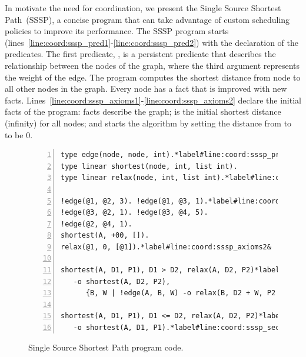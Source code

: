 In motivate the need for coordination, we present the Single Source Shortest
Path~(SSSP), a concise program that can take advantage of custom scheduling
policies to improve its performance. The SSSP program starts
(lines~\ref{line:coord:sssp_pred1}-\ref{line:coord:sssp_pred2}) with the
declaration of the predicates. The first predicate, , is a persistent
predicate that describes the relationship between the nodes of the graph, where
the third argument represents the weight of the edge.  The program computes the
shortest distance from node  to all other nodes in the graph. Every
node has a  fact that is improved with new  facts.
Lines~\ref{line:coord:sssp_axioms1}-\ref{line:coord:sssp_axioms2} declare the
initial facts of the program:  facts describe the graph;  is the initial shortest distance (infinity) for all nodes; and
 starts the algorithm by setting the distance from
 to  to be 0.

\begin{figure}[ht]
\begin{Verbatim}[numbers=left,fontsize=\codesize,commandchars=\*\#\&]
type edge(node, node, int).*label#line:coord:sssp_pred1&
type linear shortest(node, int, list int).
type linear relax(node, int, list int).*label#line:coord:sssp_pred2&

!edge(@1, @2, 3). !edge(@1, @3, 1).*label#line:coord:sssp_axioms1&
!edge(@3, @2, 1). !edge(@3, @4, 5).
!edge(@2, @4, 1).
shortest(A, +00, []).
relax(@1, 0, [@1]).*label#line:coord:sssp_axioms2&

shortest(A, D1, P1), D1 > D2, relax(A, D2, P2)*label#line:coord:sssp_first1&
   -o shortest(A, D2, P2),
      {B, W | !edge(A, B, W) -o relax(B, D2 + W, P2 ++ [B])}.*label#line:coord:sssp_first2&

shortest(A, D1, P1), D1 <= D2, relax(A, D2, P2)*label#line:coord:sssp_second1&
   -o shortest(A, D1, P1).*label#line:coord:sssp_second2&
\end{Verbatim}
\caption{Single Source Shortest Path program code.}
\label{code:shortest_path_program}
\end{figure}

